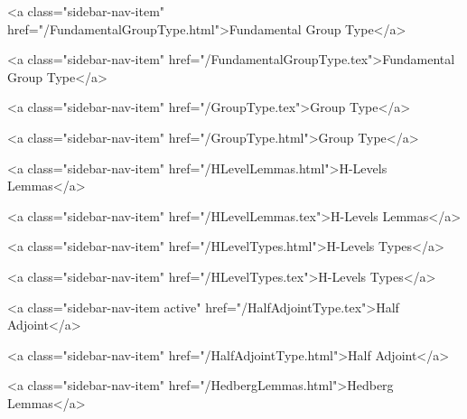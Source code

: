       
        
          <a class="sidebar-nav-item" href="/FundamentalGroupType.html">Fundamental Group Type</a>
        
      
    
      
        
          <a class="sidebar-nav-item" href="/FundamentalGroupType.tex">Fundamental Group Type</a>
        
      
    
      
        
          <a class="sidebar-nav-item" href="/GroupType.tex">Group Type</a>
        
      
    
      
        
          <a class="sidebar-nav-item" href="/GroupType.html">Group Type</a>
        
      
    
      
        
          <a class="sidebar-nav-item" href="/HLevelLemmas.html">H-Levels Lemmas</a>
        
      
    
      
        
          <a class="sidebar-nav-item" href="/HLevelLemmas.tex">H-Levels Lemmas</a>
        
      
    
      
        
          <a class="sidebar-nav-item" href="/HLevelTypes.html">H-Levels Types</a>
        
      
    
      
        
          <a class="sidebar-nav-item" href="/HLevelTypes.tex">H-Levels Types</a>
        
      
    
      
        
          <a class="sidebar-nav-item active" href="/HalfAdjointType.tex">Half Adjoint</a>
        
      
    
      
        
          <a class="sidebar-nav-item" href="/HalfAdjointType.html">Half Adjoint</a>
        
      
    
      
        
          <a class="sidebar-nav-item" href="/HedbergLemmas.html">Hedberg Lemmas</a>
        
